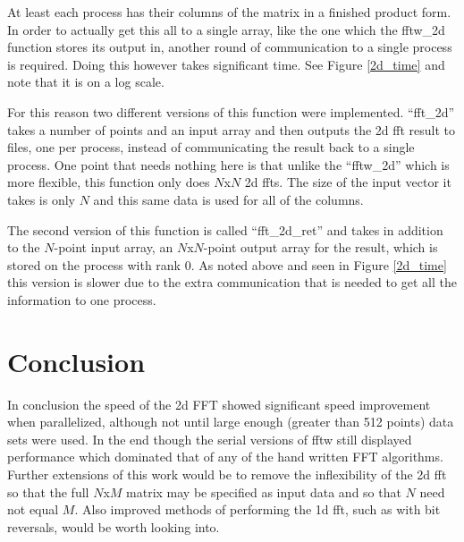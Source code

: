 \documentclass[12pt]{article}
\begin{document}
At least each process has their columns
of the matrix in a finished product form. In order to actually get this all
to a single array, like the one which the fftw\_2d function stores its
output in, another round of communication to a single process is required.
Doing this however takes significant time. See Figure \ref{2d_time} and note
that it is on a log scale. 

For this reason two different versions of this
function were implemented. ``fft\_2d'' takes a number of points and an input
array and then outputs the 2d fft result to files, one per process, instead
of communicating the result back to a single process. One point that needs
nothing here is that unlike the ``fftw\_2d'' which is more flexible, this
function only does $N$x$N$ 2d ffts. The size of the input vector it takes
is only $N$ and this same data is used for all of the columns.

The second version of this function is called ``fft\_2d\_ret'' and takes in
addition to the $N$-point input array, an $N$x$N$-point output array for 
the result, which is stored on the process with rank 0. As noted above and 
seen in Figure \ref{2d_time} this version
is slower due to the extra communication that is needed to get all the
information to one process.

\section{Conclusion}
In conclusion the speed of the 2d FFT showed significant speed improvement when parallelized, although not until large enough (greater than 512 points) data
sets were used. In the end though the serial versions of fftw still displayed performance which dominated that of any of the hand written FFT algorithms.
Further extensions of this work would be to remove the inflexibility of the
2d fft so that the full $N$x$M$ matrix may be specified as input data
and so that $N$ need not equal $M$. Also improved methods of performing
the 1d fft, such as with bit reversals, would be worth looking into.



\end{document}
